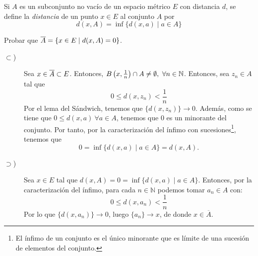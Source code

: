 \begin{ejercicio}
    Si $A$ es un subconjunto no vacío de un espacio métrico $E$ con distancia $d$, se define la \emph{distancia} de un punto $x\in E$ al conjunto $A$ por
    $$d(x,A) = \inf\{ d(x,a) \mid a \in A\}$$

    Probar que $ \overline{A} = \{x \in E \mid d(x,A) = 0\}$.
    \begin{description}
        \item[$\subset$)] Sea $x\in \overline{A}\subset E$. Entonces, $B\left(x,\frac{1}{n}\right)\cap A\neq \emptyset,~\forall n\in \mathbb{N}$. Entonces, sea $z_n\in A$ tal que
        $$0\leq d\left(x,z_n\right)< \frac{1}{n}$$
        Por el lema del Sándwich, tenemos que $\{d(x,z_n)\}\to 0$. Además, como se tiene que $0\leq d(x,a)~\forall a\in A$, tenemos que $0$ es un minorante del conjunto. Por tanto, por la caracterización del ínfimo con sucesiones\footnote{El ínfimo de un conjunto es el único minorante que es límite de una sucesión de elementos del conjunto.}, tenemos que $$0=\inf\{d(x,a)\mid a\in A\}=d(x,A).$$

        \item[$\supset$)] Sea $x\in E$ tal que $d(x,A)=0=\inf\{d(x,a)\mid a\in A\}$. Entonces, por la caracterización del ínfimo, para cada $n\in \mathbb{N}$ podemos tomar $a_n\in A$ con:
            \begin{equation*}
                0 \leq d(x,a_n) < \dfrac{1}{n}
            \end{equation*}
            Por lo que $\{d(x,a_n)\}\longrightarrow 0$, luego $\{a_n\}\longrightarrow x $, de donde $x\in \overline{A}$.
    \end{description}
\end{ejercicio}


